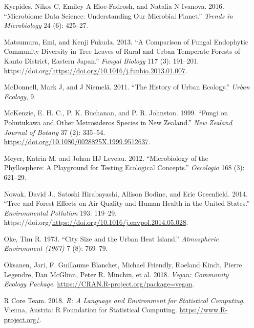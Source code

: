 \documentclass[fleqn,10pt,lineno]{wlpeerj} %
\newlength{\cslhangindent}
\newenvironment{CSLReferences}[2] %
 {%
  \setlength{\parindent}{0pt}
  \ifodd #1 \everypar{\setlength{\hangindent}{\cslhangindent}}\ignorespaces\fi
  \ifnum #2 > 0
  \setlength{\parskip}{#2\baselineskip}
  \fi
 }%
 {}
\begin{document}
\begin{CSLReferences}{1}{0}
\leavevmode{}%
Kyrpides, Nikos C, Emiley A Eloe-Fadrosh, and Natalia N Ivanova. 2016. {``Microbiome Data Science: Understanding Our Microbial Planet.''} \emph{Trends in Microbiology} 24 (6): 425--27.

\leavevmode{}%
Matsumura, Emi, and Kenji Fukuda. 2013. {``A Comparison of Fungal Endophytic Community Diversity in Tree Leaves of Rural and Urban Temperate Forests of Kanto District, Eastern Japan.''} \emph{Fungal Biology} 117 (3): 191--201. https://doi.org/\url{https://doi.org/10.1016/j.funbio.2013.01.007}.

\leavevmode{}%
McDonnell, Mark J, and J Niemelä. 2011. {``The History of Urban Ecology.''} \emph{Urban Ecology}, 9.

\leavevmode{}%
McKenzie, E. H. C., P. K. Buchanan, and P. R. Johnston. 1999. {``Fungi on Pohutukawa and Other Metrosideros Species in New Zealand.''} \emph{New Zealand Journal of Botany} 37 (2): 335--54. \url{https://doi.org/10.1080/0028825X.1999.9512637}.

\leavevmode{}%
Meyer, Katrin M, and Johan HJ Leveau. 2012. {``Microbiology of the Phyllosphere: A Playground for Testing Ecological Concepts.''} \emph{Oecologia} 168 (3): 621--29.

\leavevmode{}%
Nowak, David J., Satoshi Hirabayashi, Allison Bodine, and Eric Greenfield. 2014. {``Tree and Forest Effects on Air Quality and Human Health in the United States.''} \emph{Environmental Pollution} 193: 119--29. https://doi.org/\url{https://doi.org/10.1016/j.envpol.2014.05.028}.

\leavevmode{}%
Oke, Tim R. 1973. {``City Size and the Urban Heat Island.''} \emph{Atmospheric Environment (1967)} 7 (8): 769--79.

\leavevmode{}%
Oksanen, Jari, F. Guillaume Blanchet, Michael Friendly, Roeland Kindt, Pierre Legendre, Dan McGlinn, Peter R. Minchin, et al. 2018. \emph{Vegan: Community Ecology Package}. \url{https://CRAN.R-project.org/package=vegan}.

\leavevmode{}%
R Core Team. 2018. \emph{R: A Language and Environment for Statistical Computing}. Vienna, Austria: R Foundation for Statistical Computing. \url{https://www.R-project.org/}.


\end{CSLReferences}
\end{document}

